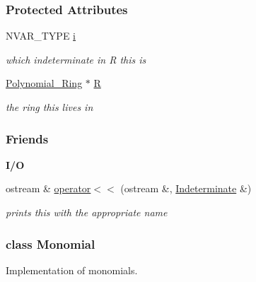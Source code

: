 \subsubsection*{Protected Attributes}
\begin{DoxyCompactItemize}
\item 
\mbox{\label{group__polygroup_aab06276a83206026ef44fb6249971796}} 
N\+V\+A\+R\+\_\+\+T\+Y\+PE \hyperlink{group__polygroup_aab06276a83206026ef44fb6249971796}{i}
\begin{DoxyCompactList}\small\item\em which indeterminate in {\ttfamily R} {\ttfamily this} is \end{DoxyCompactList}\item 
\mbox{\label{group__polygroup_a78f5339712602f11e29a091d228032c4}} 
\hyperlink{group__polygroup_class_polynomial___ring}{Polynomial\+\_\+\+Ring} $\ast$ \hyperlink{group__polygroup_a78f5339712602f11e29a091d228032c4}{R}
\begin{DoxyCompactList}\small\item\em the ring {\ttfamily this} lives in \end{DoxyCompactList}\end{DoxyCompactItemize}
\subsubsection*{Friends}
\begin{Indent}\textbf{ I/O}\par
\begin{DoxyCompactItemize}
\item 
\mbox{\label{group__polygroup_a0fbbf892bdfabc97b41ec7e486e83125}} 
ostream \& \hyperlink{group__polygroup_a0fbbf892bdfabc97b41ec7e486e83125}{operator$<$$<$} (ostream \&, \hyperlink{group__polygroup_class_indeterminate}{Indeterminate} \&)
\begin{DoxyCompactList}\small\item\em prints {\ttfamily this} with the appropriate name \end{DoxyCompactList}\end{DoxyCompactItemize}
\end{Indent}
\label{class_monomial}
\subsubsection{class Monomial}
Implementation of monomials. 

